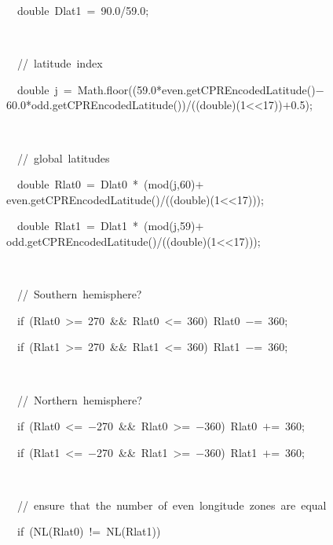 {{{\ }\ double\ Dlat1\ $\mathord{=}$\ 90.0/59.0;\leavevmode\par
{\ }\leavevmode\par
{\ }\ //\ latitude\ index\leavevmode\par
{\ }\ double\ j\ $\mathord{=}$\ Math.floor((59.0*even.getCPREncodedLatitude()$\mathord{-}$60.0*odd.getCPREncodedLatitude())/((double)(1$\mathord{<}$$\mathord{<}$17))$\mathord{+}$0.5);\leavevmode\par
{\ }\leavevmode\par
{\ }\ //\ global\ latitudes\leavevmode\par
{\ }\ double\ Rlat0\ $\mathord{=}$\ Dlat0\ *\ (mod(j,60)$\mathord{+}$even.getCPREncodedLatitude()/((double)(1$\mathord{<}$$\mathord{<}$17)));\leavevmode\par
{\ }\ double\ Rlat1\ $\mathord{=}$\ Dlat1\ *\ (mod(j,59)$\mathord{+}$odd.getCPREncodedLatitude()/((double)(1$\mathord{<}$$\mathord{<}$17)));\leavevmode\par
{\ }\leavevmode\par
{\ }\ //\ Southern\ hemisphere?\leavevmode\par
{\ }\ if\ (Rlat0\ $\mathord{>}$$\mathord{=}$\ 270\ \&{}\&{}\ Rlat0\ $\mathord{<}$$\mathord{=}$\ 360)\ Rlat0\ $\mathord{-}$$\mathord{=}$\ 360;\leavevmode\par
{\ }\ if\ (Rlat1\ $\mathord{>}$$\mathord{=}$\ 270\ \&{}\&{}\ Rlat1\ $\mathord{<}$$\mathord{=}$\ 360)\ Rlat1\ $\mathord{-}$$\mathord{=}$\ 360;\leavevmode\par
{\ }\leavevmode\par
{\ }\ //\ Northern\ hemisphere?\leavevmode\par
{\ }\ if\ (Rlat0\ $\mathord{<}$$\mathord{=}$\ $\mathord{-}$270\ \&{}\&{}\ Rlat0\ $\mathord{>}$$\mathord{=}$\ $\mathord{-}$360)\ Rlat0\ $\mathord{+}$$\mathord{=}$\ 360;\leavevmode\par
{\ }\ if\ (Rlat1\ $\mathord{<}$$\mathord{=}$\ $\mathord{-}$270\ \&{}\&{}\ Rlat1\ $\mathord{>}$$\mathord{=}$\ $\mathord{-}$360)\ Rlat1\ $\mathord{+}$$\mathord{=}$\ 360;\leavevmode\par
{\ }\leavevmode\par
{\ }\ //\ ensure\ that\ the\ number\ of\ even\ longitude\ zones\ are\ equal\leavevmode\par
{\ }\ if\ (NL(Rlat0)\ !$\mathord{=}$\ NL(Rlat1))\leavevmode\par
$$}}
